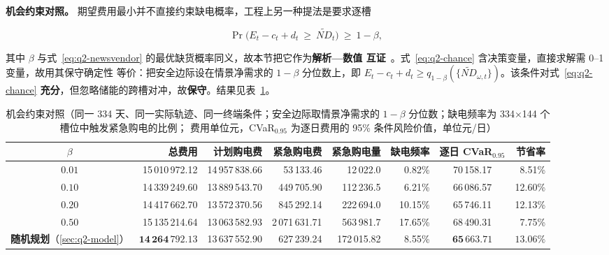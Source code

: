 \textbf{机会约束对照。} 期望费用最小并不直接约束缺电概率，工程上另一种提法是要求逐槽

\begin{equation}
  \Pr\bigl(E_t-c_t+d_t\ \ge\ \widetilde{ND}_t\bigr)\ \ge\ 1-\beta ,
  \label{eq:q2-chance}
\end{equation}

其中 \(\beta\) 与式~\eqref{eq:q2-newsvendor} 的最优缺货概率同义，故本节把它作为\textbf{解析—数值
互证}~\cite{refzhangzt}。式~\eqref{eq:q2-chance} 含决策变量，直接求解需 0--1 变量，故用其保守确定性
等价：把安全边际设在情景净需求的 \(1-\beta\) 分位数上，即
\(E_t-c_t+d_t\ge q_{1-\beta}(\{\widetilde{ND}_{\omega,t}\})\)。该条件对式~\eqref{eq:q2-chance}
\textbf{充分}，但忽略储能的跨槽对冲，故\textbf{保守}。结果见表~\ref{tab:chance}。

\begin{table}[htbp]
  \centering
  \caption{机会约束对照（同一 334 天、同一实际轨迹、同一终端条件；安全边际取情景净需求的
           $1-\beta$ 分位数；缺电频率为 334$\times$144 个槽位中触发紧急购电的比例；
           费用单位元，CVaR$_{0.95}$ 为逐日费用的 95\% 条件风险价值，单位元/日）}
  \label{tab:chance}
  \small
  \setlength{\tabcolsep}{3pt}
  \begin{tabular}{crrrrrcr}
    \toprule
    $\beta$ & 总费用 & 计划购电费 & 紧急购电费 & 紧急购电量 & 缺电频率 & 逐日 CVaR$_{0.95}$ & 节省率 \\
    \midrule
    $0.01$ & 15\,010\,972.12 & 14\,957\,838.66 & 53\,133.46 & 12\,022.0 & 0.82\% & 70\,158.17 & 8.51\% \\
    $0.10$ & 14\,339\,249.60 & 13\,889\,543.70 & 449\,705.90 & 112\,236.5 & 6.21\% & 66\,086.57 & 12.60\% \\
    $0.20$ & 14\,417\,662.70 & 13\,572\,370.56 & 845\,292.14 & 222\,694.0 & 10.15\% & 65\,746.11 & 12.13\% \\
    $0.50$ & 15\,135\,214.64 & 13\,063\,582.93 & 2\,071\,631.71 & 563\,981.7 & 17.65\% & 68\,490.31 & 7.75\% \\
    \midrule
    \textbf{随机规划}（\ref{sec:q2-model}） & $\mathbf{14\,264\,792.13}$ & 13\,637\,552.90 & 627\,239.24 & 172\,015.82 & 8.55\% & $\mathbf{65\,663.71}$ & $\mathbf{13.06\%}$ \\
    \bottomrule
  \end{tabular}
\end{table}

